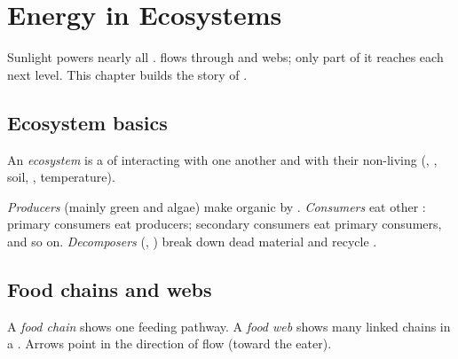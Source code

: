 \chapter{Energy in Ecosystems}\label{ch:g7:eco-energy}

Sunlight powers nearly all .  flows through 
and webs; only part of it reaches each next level. This chapter builds
the  story of .

\section{Ecosystem basics}

\begin{definition}[Ecosystem]\label{def:g7:eco-energy:ecosystem}
An \emph{ecosystem} is a  of 
interacting with one another and with their non-living 
(, , soil, , temperature).
\end{definition}

\begin{definition}\label{def:g7:eco-energy:roles}
\emph{Producers} (mainly green  and algae) make
organic  by . \emph{Consumers} eat other
: primary consumers eat producers; secondary consumers eat primary
consumers, and so on. \emph{Decomposers} (,
) break down dead material and recycle .
\end{definition}

\section{Food chains and webs}

\begin{definition}\label{def:g7:eco-energy:chain}
A \emph{food chain} shows one feeding pathway. A
\emph{food web} shows many linked chains in a .
Arrows point in the direction of  flow (toward the eater).
\end{definition}

